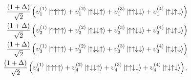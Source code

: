 \documentclass[aps,amsmath,twocolumn,amssymb,floatfix,showpacs,superscriptaddress,nofootinbib,longbibliography]{revtex4-1}
\begin{document}
{
\small
\begin{eqnarray}
	\frac{(1+\Delta)}{\sqrt{2}}\left(\upsilon_1^{(1)} \ket{\uparrow\uparrow\uparrow\uparrow}+\upsilon_1^{(2)}\ket{\uparrow\downarrow\downarrow\uparrow}+\upsilon_1^{(3)}\ket{\uparrow\uparrow\downarrow\downarrow}+\upsilon_1^{(4)}\ket{\uparrow\downarrow\uparrow\downarrow}\right)\nonumber \\
	\frac{(1+\Delta)}{\sqrt{2}}\left(\upsilon_2^{(1)} \ket{\uparrow\uparrow\uparrow\uparrow}+\upsilon_2^{(2)}\ket{\uparrow\downarrow\downarrow\uparrow}+\upsilon_2^{(3)}\ket{\uparrow\uparrow\downarrow\downarrow}+\upsilon_2^{(4)}\ket{\uparrow\downarrow\uparrow\downarrow}\right) \nonumber\\
	\frac{(1+\Delta)}{\sqrt{2}}\left(\upsilon_3^{(1)} \ket{\uparrow\uparrow\uparrow\uparrow}+\upsilon_3^{(2)}\ket{\uparrow\downarrow\downarrow\uparrow}+\upsilon_3^{(3)}\ket{\uparrow\uparrow\downarrow\downarrow}+\upsilon_3^{(4)}\ket{\uparrow\downarrow\uparrow\downarrow}\right)\nonumber \\
	\frac{(1+\Delta)}{\sqrt{2}}\left(\upsilon_4^{(1)} \ket{\uparrow\uparrow\uparrow\uparrow}+\upsilon_4^{(2)}\ket{\uparrow\downarrow\downarrow\uparrow}+\upsilon_4^{(3)}\ket{\uparrow\uparrow\downarrow\downarrow}+\upsilon_4^{(4)}\ket{\uparrow\downarrow\uparrow\downarrow}\right),\nonumber\\
\end{eqnarray}
}
\end{document}
